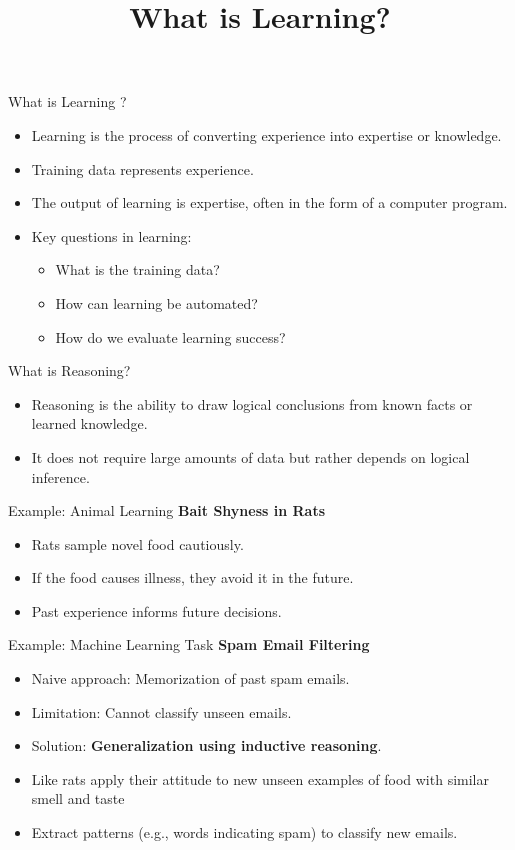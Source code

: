 \documentclass{beamer}
\title{What is Learning?}
\author{}
\date{}
\begin{document}
\frame{\titlepage}

\begin{frame}{What is  Learning ?}
    \begin{itemize}
        \item Learning is the process of converting experience into expertise or knowledge.
        \item Training data represents experience.
        \item The output of learning is expertise, often in the form of a computer program.
        \item Key questions in learning:
        \begin{itemize}
            \item What is the training data?
            \item How can learning be automated?
            \item How do we evaluate learning success?
        \end{itemize}
    \end{itemize}
\end{frame}

\begin{frame}{What is Reasoning?}
    \begin{itemize}
        \item Reasoning is the ability to draw logical conclusions from known facts or learned knowledge.
        \item It does not require large amounts of data but rather depends on logical inference.
    \end{itemize}
\end{frame}


\begin{frame}{Example: Animal Learning}
    \textbf{Bait Shyness in Rats}
    \begin{itemize}
        \item Rats sample novel food cautiously.
        \item If the food causes illness, they avoid it in the future.
        \item Past experience informs future decisions.
    \end{itemize}
\end{frame}

\begin{frame}{Example: Machine Learning Task}
    \textbf{Spam Email Filtering}
    \begin{itemize}
        \item Naive approach: Memorization of past spam emails.
        \item Limitation: Cannot classify unseen emails.
        \item Solution: \textbf{Generalization using inductive reasoning}.
        \item Like rats apply their attitude to new unseen examples of food with similar smell and taste
        \item Extract patterns (e.g., words indicating spam) to classify new emails.
    \end{itemize}
\end{frame}
\end{document}

